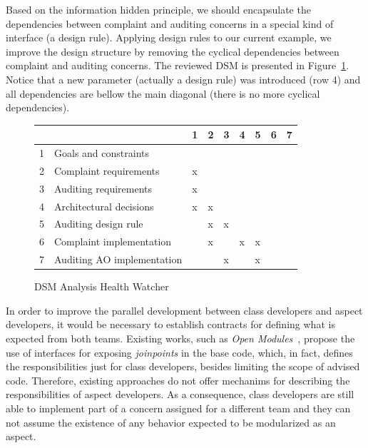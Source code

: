 Based on the information hidden principle, we should encapsulate the
dependencies between complaint and auditing concerns in a special kind
of interface (a design rule). 
Applying design rules to our current example, we improve the design structure
by removing the cyclical dependencies between complaint and auditing concerns.
The reviewed DSM is presented in Figure~\ref{dsm:hw02}. Notice that a new parameter
(actually a design rule) was introduced (row 4) and all dependencies are bellow
the main diagonal (there is no more cyclical dependencies).

\begin{figure}[htb]
\centering
\begin{scriptsize}
\begin{tabular}{|l|l|l|l|l|l|l|l|l|} \hline
  &                                 & 1     & 2     & 3     & 4     & 5     & 6 & 7 \\ \hline
1 & Goals and constraints           &       &       &       &       &       &   &   \\ \hline
2 & Complaint requirements          & x     &       &       &       &       &   &   \\ \hline
3 & Auditing requirements           & x     &       &       &       &       &   &   \\ \hline
4 & Architectural decisions         & x     & x     &       &       &       &   &   \\ \hline
5 & Auditing design rule            &       & x     &   x   &       &       &   &   \\ \hline
6 & Complaint implementation        &       & x     &       &   x   & x     &   &   \\ \hline
7 & Auditing AO implementation      &       &       &   x   &       & x     &   &   \\ \hline
\end{tabular}
\end{scriptsize}
\caption{DSM Analysis Health Watcher}
\label{dsm:hw02}
\end{figure}

In order to improve the parallel development between class developers and 
aspect developers, it would be necessary to establish contracts for defining what 
is expected from both teams. Existing works, such as \emph{Open Modules}~\cite{aldrich-ecoop-05}, 
propose the use of interfaces for exposing \emph{joinpoints} in the base code, which, in fact, 
defines the responsibilities just for class developers, besides limiting the scope of advised code. 
Therefore, existing approaches do not offer mechanims for describing the responsibilities of aspect developers. 
As a consequence, class developers are still able to implement part of a concern 
assigned for a different team and they can not assume the existence 
of any behavior expected to be modularized as an aspect. 

